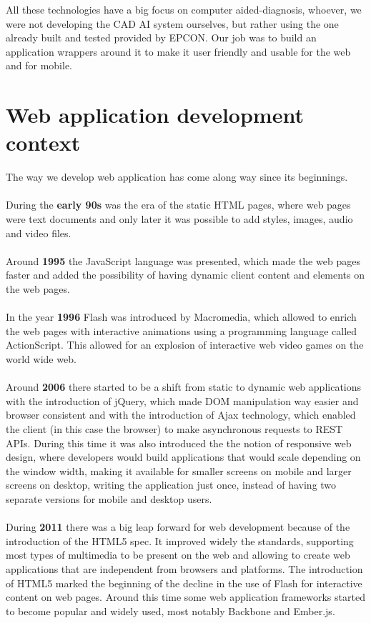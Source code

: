 All these technologies have a big focus on computer aided-diagnosis, whoever, we were not developing the CAD AI system ourselves, but rather using the one already built and tested provided by EPCON. Our job was to build an application wrappers around it to make it user friendly and usable for the web and for mobile.

\section{Web application development context}

The way we develop web application has come along way since its beginnings.
\\ \\
During the \textbf{early 90s} was the era of the static HTML pages, where web pages were text documents and only later it was possible to add styles, images, audio and video files.
\\ \\
Around \textbf{1995} the JavaScript language was presented, which made the web pages faster and added the possibility of having dynamic client content and elements on the web pages.
\\ \\
In the year \textbf{1996} Flash was introduced by Macromedia, which allowed to enrich the web pages with interactive animations using a programming language called ActionScript. This allowed for an explosion of interactive web video games on the world wide web.
\\ \\
Around \textbf{2006} there started to be a shift from static to dynamic web applications with the introduction of jQuery, which made DOM manipulation way easier and browser consistent and with the introduction of Ajax technology, which enabled the client (in this case the browser) to make asynchronous requests to REST APIs. During this time it was also introduced the the notion of responsive web design, where developers would build applications that would scale depending on the window width, making it available for smaller screens on mobile and larger screens on desktop, writing the application just once, instead of having two separate versions for mobile and desktop users.
\\ \\
During \textbf{2011} there was a big leap forward for web development because of the introduction of the HTML5 spec. It improved widely the standards, supporting most types of multimedia to be present on the web and allowing to create web applications that are independent from browsers and platforms. The introduction of HTML5 marked the beginning of the decline in the use of Flash for interactive content on web pages. Around this time some web application frameworks started to become popular and widely used, most notably Backbone and Ember.js.
